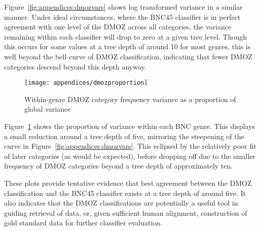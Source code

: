 Figure~\ref{fig:appendices:dmozvars} shows log transformed variance in a similar manner.  Under ideal circumstances, where the BNC45 classifier is in perfect agreement with one level of the DMOZ across all categories, the variance remaining within each classifier will drop to zero at a given tree level.  Though this occurs for some values at a tree depth of around 10 for most genres, this is well beyond the bell curve of DMOZ classification, indicating that fewer DMOZ categories descend beyond this depth anyway.

\begin{figure}[h]
    \centering
    \texttt{[image: appendices/dmozproportion]}
    \caption{Within-genre DMOZ category frequency variance as a proportion of global variance}
    \label{fig:appendices:dmozproportion}
\end{figure}

\FloatBarrier

Figure~\ref{fig:appendices:dmozproportion} shows the proportion of variance within each BNC genre.  This displays a small reduction around a tree depth of five, mirroring the steepening of the curve in Figure~\ref{fig:appendices:dmozvars}.  This eclipsed by the relatively poor fit of later categories (as would be expected), before dropping off due to the smaller frequency of DMOZ categories beyond a tree depth of approximately ten.

These plots provide tentative evidence that best agreement between the DMOZ classification and the BNC45 classifier exists at a tree depth of around five.  It also indicates that the DMOZ classifications are potentially a useful tool in guiding retrieval of data, or, given sufficient human alignment, construction of gold standard data for further classifier evaluation.



